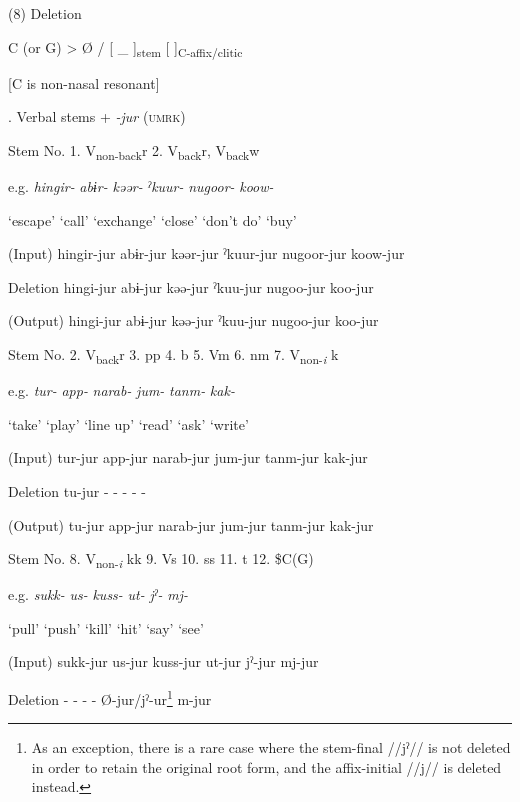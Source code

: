 (8)  Deletion

  C (or G)  >  Ø  /  [   \_ ]\textsubscript{stem}  [   ]\textsubscript{C-affix/clitic}

  [C is non-nasal resonant]    

\begin{styleBeschriftung}
\textmd{. Verbal stems +} \textmd{\textit{{}-jur}}\textmd{ (\textsc{umrk})}
\end{styleBeschriftung}

Stem No.  1. V\textsubscript{non-back}r  2. V\textsubscript{back}r, V\textsubscript{back}w

e.g.  \textit{hingir-}  \textit{abɨr-}  \textit{kəər-}  \textit{ˀkuur-}  \textit{nugoor-}  \textit{koow-}

  ‘escape’  ‘call’  ‘exchange’  ‘close’  ‘don’t do’  ‘buy’

(Input)  hingir-jur  abɨr-jur  kəər-jur  ˀkuur-jur  nugoor-jur  koow-jur

Deletion  hingi-jur  abɨ-jur  kəə-jur  ˀkuu-jur  nugoo-jur  koo-jur

(Output)  hingi-jur  abɨ-jur  kəə-jur  ˀkuu-jur  nugoo-jur  koo-jur

Stem No.  2. V\textsubscript{back}r  3. pp  4. b  5. Vm  6. nm  7. V\textsubscript{non-}\textit{\textsubscript{i} }k

e.g.  \textit{tur-}  \textit{app-}  \textit{narab-}  \textit{jum-}  \textit{tanm-}  \textit{kak-}

  ‘take’  ‘play’  ‘line up’  ‘read’  ‘ask’  ‘write’

(Input)  tur-jur  app-jur  narab-jur  jum-jur  tanm-jur  kak-jur

Deletion  tu-jur  {}-  {}-  {}-  {}-  {}-

(Output)  tu-jur  app-jur  narab-jur  jum-jur  tanm-jur  kak-jur

Stem No.  8. V\textsubscript{non-}\textit{\textsubscript{i} }kk  9. Vs  10. ss  11. t  12. \$C(G)

e.g.  \textit{sukk-}  \textit{us-}  \textit{kuss-}  \textit{ut-}  \textit{jˀ-}  \textit{mj-}

  ‘pull’  ‘push’  ‘kill’  ‘hit’  ‘say’  ‘see’

(Input)  sukk-jur  us-jur  kuss-jur  ut-jur  jˀ-jur  mj-jur

Deletion  {}-  {}-  {}-  {}-  Ø-jur/jˀ-ur\footnote{As an exception, there is a rare case where the stem-final //jˀ// is not deleted in order to retain the original root form, and the affix-initial //j// is deleted instead.}  m-jur

